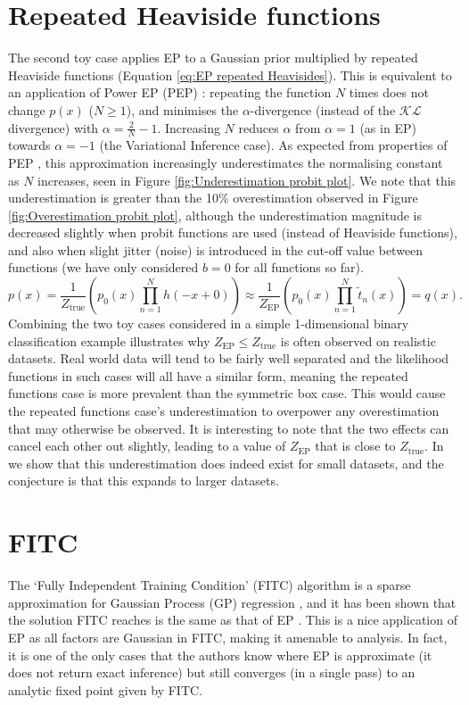 \documentclass{article}
\newcommand{\KLdivK}{\mathcal{K}}
\newcommand{\KLdivL}{\mathcal{L}}
\begin{document}
\section{Repeated Heaviside functions}
%
The second toy case applies EP to a Gaussian prior multiplied by repeated Heaviside functions (Equation \ref{eq:EP repeated Heavisides}). This is equivalent to an application of Power EP (PEP) \citep{minka_power_2004}: repeating the function $N$ times does not change $p(x)$ ($N \geq 1$), and minimises the $\alpha$-divergence (instead of the $\KLdivK \KLdivL$ divergence) with $\alpha = \frac{2}{N} - 1$. Increasing $N$ reduces $\alpha$ from $\alpha = 1$ (as in EP) towards $\alpha=-1$ (the Variational Inference case). As expected from properties of PEP \citep{minka_divergence_2005}, this approximation increasingly underestimates the normalising constant as $N$ increases, seen in Figure \ref{fig:Underestimation probit plot}. We note that this underestimation is greater than the 10\% overestimation observed in Figure \ref{fig:Overestimation probit plot}, although the underestimation magnitude is decreased slightly when probit functions are used (instead of Heaviside functions), and also when slight jitter (noise) is introduced in the cut-off value between functions (we have only considered $b=0$ for all functions so far).
%
\begin{equation} \label{eq:EP repeated Heavisides}
p(x) = \frac{1}{Z_\mathrm{true}} \left( p_0(x) \prod_{n=1}^N h(- x + 0) \right) \approx \frac{1}{Z_\mathrm{EP}} \left( p_0(x) \prod_{n=1}^N \tilde{t}_{n}(x) \right) = q(x).
\end{equation}
%
Combining the two toy cases considered in a simple 1-dimensional binary classification example illustrates why $Z_\mathrm{EP} \leq Z_\mathrm{true}$ is often observed on realistic datasets. Real world data will tend to be fairly well separated and the likelihood functions in such cases will all have a similar form, meaning the repeated functions case is more prevalent than the symmetric box case. This would cause the repeated functions case's underestimation to overpower any overestimation that may otherwise be observed. It is interesting to note that the two effects can cancel each other out slightly, leading to a value of $Z_\mathrm{EP}$ that is close to $Z_\mathrm{true}$. In \citet{swaroop_understanding_2017} we show that this underestimation does indeed exist for small datasets, and the conjecture is that this expands to larger datasets.
%
\section{FITC}
%
The ‘Fully Independent Training Condition’ (FITC) algorithm is a sparse approximation for Gaussian Process (GP) regression \citep{csato_sparse_2002}, and it has been shown that the solution FITC reaches is the same as that of EP \citep{bui_unifying_2017}. This is a nice application of EP as all factors are Gaussian in FITC, making it amenable to analysis. In fact, it is one of the only cases that the authors know where EP is approximate (it does not return exact inference) but still converges (in a single pass) to an analytic fixed point given by FITC.
\end{document}
